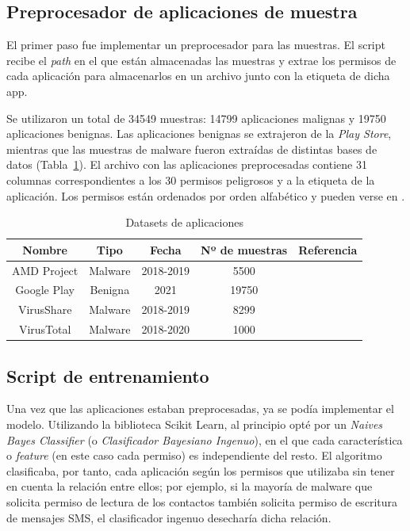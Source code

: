 \subsection{Preprocesador de aplicaciones de muestra}

El primer paso fue implementar un preprocesador para las muestras. El script recibe el \textit{path} en el que están almacenadas las muestras y extrae los permisos de cada aplicación para almacenarlos en un archivo junto con la etiqueta de dicha app.

Se utilizaron un total de 34549 muestras: 14799 aplicaciones malignas y 19750 aplicaciones benignas. Las aplicaciones benignas se extrajeron de la \textit{Play Store}, mientras que las muestras de malware fueron extraídas de distintas bases de datos (Tabla~\ref{tab:dataset}). El archivo con las aplicaciones preprocesadas contiene 31 columnas correspondientes a los 30 permisos peligrosos y a la etiqueta de la aplicación. Los permisos están ordenados por orden alfabético y pueden verse en \textit{}.

\begin{table}[H]
\begin{tabular}{|c|c|c|c|c|}
\hline
\textbf{Nombre} & \textbf{Tipo} & \textbf{Fecha} & \textbf{Nº de muestras} & \textbf{Referencia} \\ \hline
AMD Project     & Malware       & 2018-2019      & 5500                    & \hypersetup{citecolor=red}\cite{amd}                    \\ \hline
Google Play     & Benigna       & 2021           & 19750                   & \hypersetup{citecolor=red}\cite{playstore}                    \\ \hline
VirusShare      & Malware       & 2018-2019      & 8299                    & \hypersetup{citecolor=red}\cite{virusshare}                    \\ \hline
VirusTotal      & Malware       & 2018-2020      & 1000                    & \hypersetup{citecolor=red}\cite{virustotal}                    \\ \hline
\end{tabular}
\caption{Datasets de aplicaciones}
\label{tab:dataset}
\end{table}

\subsection{Script de entrenamiento}

Una vez que las aplicaciones estaban preprocesadas, ya se podía implementar el modelo. Utilizando la biblioteca Scikit Learn, al principio opté por un \textit{Naives Bayes Classifier} (o \textit{Clasificador Bayesiano Ingenuo}), en el que cada característica o \textit{feature} (en este caso cada permiso) es independiente del resto. El algoritmo clasificaba, por tanto, cada aplicación según los permisos que utilizaba sin tener en cuenta la relación entre ellos; por ejemplo, si la mayoría de malware que solicita permiso de lectura de los contactos también solicita permiso de escritura de mensajes SMS, el clasificador ingenuo desecharía dicha relación.

